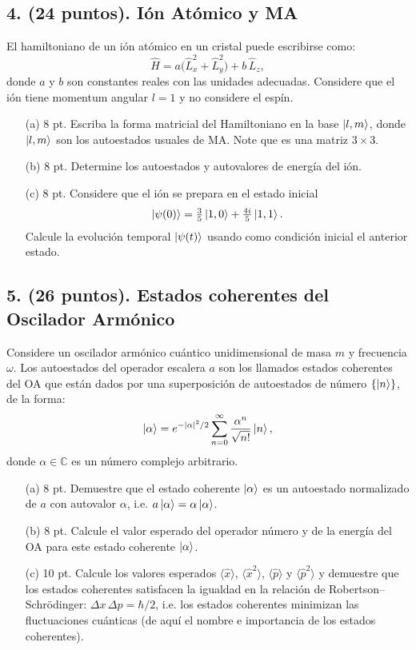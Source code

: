 \documentclass[a4paper,11pt]{article}
\begin{document}
\subsection*{4. (24 puntos). Ión Atómico y MA}
El hamiltoniano de un ión atómico en un cristal puede escribirse como:
\[
\hat H = a\big(\hat L_x^2+\hat L_y^2\big)+b\,\hat L_z,
\]
donde $a$ y $b$ son constantes reales con las unidades adecuadas. Considere que el ión tiene momentum angular $l=1$ y no considere el espín.
\begin{enumerate}
  \item[(a)] 8 pt. Escriba la forma matricial del Hamiltoniano en la base $\ket{l,m}$, donde $\ket{l,m}$ son los autoestados usuales de MA. Note que es una matriz $3\times 3$.
  \item[(b)] 8 pt. Determine los autoestados y autovalores de energía del ión.
  \item[(c)] 8 pt. Considere que el ión se prepara en el estado inicial
  \[
  \ket{\psi(0)}=\tfrac{3}{5}\ket{1,0}+\tfrac{4i}{5}\ket{1,1}.
  \]
  Calcule la evolución temporal $\ket{\psi(t)}$ usando como condición inicial el anterior estado.
\end{enumerate}

\subsection*{5. (26 puntos). Estados coherentes del Oscilador Armónico}
Considere un oscilador armónico cuántico unidimensional de masa $m$ y frecuencia $\omega$. Los autoestados del operador escalera $a$ son los llamados estados coherentes del OA que están dados por una superposición de autoestados de número $\{\ket{n}\}$, de la forma:
\[
\ket{\alpha}=e^{-|\alpha|^2/2}\sum_{n=0}^{\infty}\frac{\alpha^n}{\sqrt{n!}}\ket{n},
\]
donde $\alpha\in\mathbb{C}$ es un número complejo arbitrario.
\begin{enumerate}
  \item[(a)] 8 pt. Demuestre que el estado coherente $\ket{\alpha}$ es un autoestado normalizado de $a$ con autovalor $\alpha$, i.e. $a\ket{\alpha}=\alpha\ket{\alpha}$.
  \item[(b)] 8 pt. Calcule el valor esperado del operador número y de la energía del OA para este estado coherente $\ket{\alpha}$.
  \item[(c)] 10 pt. Calcule los valores esperados $\langle \hat x\rangle$, $\langle \hat x^2\rangle$, $\langle \hat p\rangle$ y $\langle \hat p^2\rangle$ y demuestre que los estados coherentes satisfacen la igualdad en la relación de Robertson–Schrödinger: $\Delta x\,\Delta p=\hbar/2$, i.e. los estados coherentes minimizan las fluctuaciones cuánticas (de aquí el nombre e importancia de los estados coherentes).
\end{enumerate}
\end{document}

